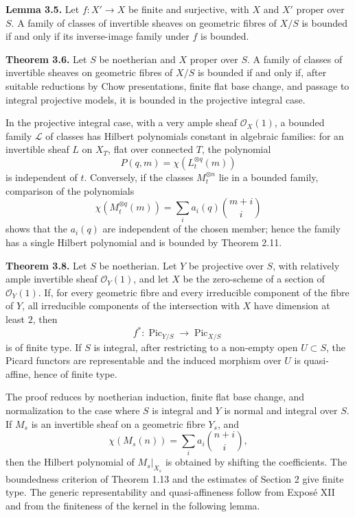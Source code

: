 \documentclass[11pt]{article}
\providecommand{\Pic}{\operatorname{Pic}}
\begin{document}
\textbf{Lemma 3.5.} Let $f:X'\to X$ be finite and surjective, with $X$ and $X'$ proper over $S$. A family of classes of invertible sheaves on geometric fibres of $X/S$ is bounded if and only if its inverse-image family under $f$ is bounded.

\textbf{Theorem 3.6.} Let $S$ be noetherian and $X$ proper over $S$. A family of classes of invertible sheaves on geometric fibres of $X/S$ is bounded if and only if, after suitable reductions by Chow presentations, finite flat base change, and passage to integral projective models, it is bounded in the projective integral case.

In the projective integral case, with a very ample sheaf $\mathcal O_X(1)$, a bounded family $\mathcal L$ of classes has Hilbert polynomials constant in algebraic families: for an invertible sheaf $L$ on $X_T$, flat over connected $T$, the polynomial
\[
 P(q,m)=\chi(L_t^{\otimes q}(m))
\]
is independent of $t$. Conversely, if the classes $M_t^{\otimes n}$ lie in a bounded family, comparison of the polynomials
\[
 \chi(M_t^{\otimes q}(m))=
 \sum_i a_i(q)\binom{m+i}{i}
\]
shows that the $a_i(q)$ are independent of the chosen member; hence the family has a single Hilbert polynomial and is bounded by Theorem 2.11.

\textbf{Theorem 3.8.} Let $S$ be noetherian. Let $Y$ be projective over $S$, with relatively ample invertible sheaf $\mathcal O_Y(1)$, and let $X$ be the zero-scheme of a section of $\mathcal O_Y(1)$. If, for every geometric fibre and every irreducible component of the fibre of $Y$, all irreducible components of the intersection with $X$ have dimension at least $2$, then
\[
 f^*: \Pic_{Y/S}\longrightarrow \Pic_{X/S}
\]
is of finite type. If $S$ is integral, after restricting to a non-empty open $U\subset S$, the Picard functors are representable and the induced morphism over $U$ is quasi-affine, hence of finite type.

The proof reduces by noetherian induction, finite flat base change, and normalization to the case where $S$ is integral and $Y$ is normal and integral over $S$. If $M_s$ is an invertible sheaf on a geometric fibre $Y_s$, and
\[
 \chi(M_s(n))=\sum_i a_i\binom{n+i}{i},
\]
then the Hilbert polynomial of $M_s|_{X_s}$ is obtained by shifting the coefficients. The boundedness criterion of Theorem 1.13 and the estimates of Section 2 give finite type. The generic representability and quasi-affineness follow from Expos\'e XII and from the finiteness of the kernel in the following lemma.
\end{document}

